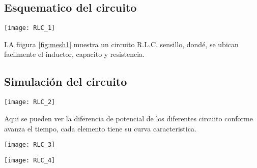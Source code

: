 \documentclass[11pt]{article}
\newenvironment{Figuras}
  {\par\medskip\noindent\minipage{\linewidth}}
  {\endminipage\par\medskip}
\begin{document}
\begin{multicols}{2}
	\subsection{Esquematico del circuito}

		\begin{Figuras}
			\centering
		    \texttt{[image: RLC\_1]}
		    \label{fig:mesh1}
		\end{Figuras}

		LA fiigura \ref{fig:mesh1} muestra un circuito R.L.C. sensillo, dondé, se ubican facilmente el inductor, capacito y resistencia.

	\subsection{Simulación del circuito}

		\begin{Figuras}
			\centering
		    \texttt{[image: RLC\_2]}
		    \label{fig:mesh1}
		\end{Figuras}

		Aqui se pueden ver la diferencia de potencial de los diferentes circuito conforme avanza el tiempo, cada elemento tiene su curva caracteristica.

		\begin{Figuras}
			\centering
		    \texttt{[image: RLC\_3]}
		    \label{fig:mesh1}
		\end{Figuras}

		\begin{Figuras}
			\centering
		    \texttt{[image: RLC\_4]}
		    \label{fig:mesh1}
		\end{Figuras}


	



\end{multicols}
\end{document}
